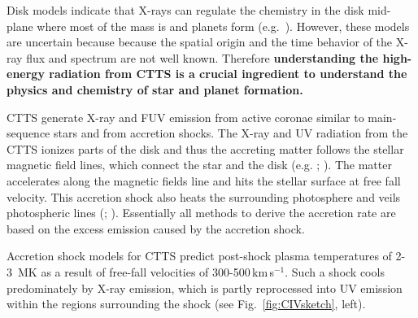 \documentclass[letterpaper,11pt,twocolumn]{article}
\begin{document}
Disk models indicate that X-rays can regulate the chemistry in the disk mid-plane where most of the mass is and planets form (e.g.\ ). However, these models are uncertain because because the spatial origin and the time behavior of the X-ray flux and spectrum are not well known.
Therefore
{\bf understanding the high-energy radiation from CTTS is a crucial ingredient to understand the physics and chemistry of star and planet formation.} 

CTTS generate X-ray and FUV emission from active coronae similar to main-sequence stars and from accretion shocks.
The X-ray and UV radiation from the CTTS ionizes parts of the disk and thus the accreting matter follows the stellar magnetic field lines, which connect the star and the disk (e.g. ; ). The matter accelerates along the magnetic fields line and hits the stellar surface at free fall velocity.
This accretion shock also heats the surrounding photosphere and veils photospheric lines (; ). Essentially all methods to derive 
the accretion rate are based on the excess emission caused by the accretion shock. 

Accretion shock models for CTTS predict post-shock plasma
temperatures of 2-3~MK as a result of free-fall velocities of 
300-500\,km\,s$^{-1}$. Such a shock cools predominately by
X-ray emission, which is partly reprocessed into UV emission within the regions surrounding the shock (see Fig.~\ref{fig:CIVsketch}, left). 
\end{document}
